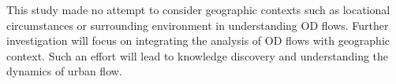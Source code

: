 \documentclass[a4paper,UKenglish]{lipics-v2018}
\begin{document}

This study made no attempt to consider geographic contexts such as locational circumstances or surrounding environment in understanding OD flows. 
Further investigation will focus on integrating the analysis of OD flows with geographic context.
Such an effort will lead to knowledge discovery and understanding the dynamics of urban flow.


%
%
%
%
%










\end{document}
